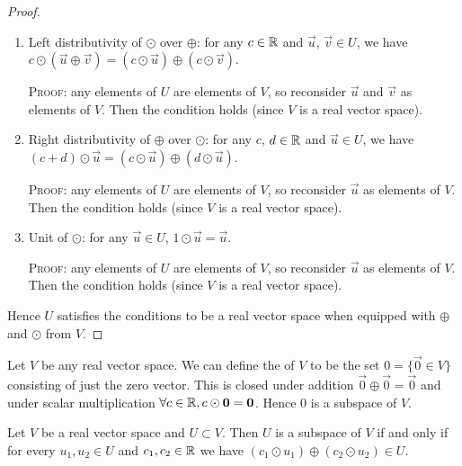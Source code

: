 \begin{proof}
\begin{enumerate}[label=(\arabic*)]
  \textsc{Proof:} This is assumption~\ref{assume:closed-under-scalar-multiplication}.
\item Left distributivity of $\odot$ over $\oplus$:
  for any $c\in\mathbb{R}$ and $\vec{u}$, $\vec{v}\in U$, we have
  $c\odot(\vec{u}\oplus\vec{v}) = (c\odot\vec{u})\oplus(c\odot\vec{v})$.

  \textsc{Proof:} any elements of $U$ are elements of $V$, so reconsider
  $\vec{u}$ and $\vec{v}$ as elements of $V$. Then the condition holds
  (since $V$ is a real vector space).
\item Right distributivity of $\oplus$ over $\odot$:
  for any $c$, $d\in\mathbb{R}$ and $\vec{u}\in U$, we have
  $(c+d)\odot\vec{u} = (c\odot\vec{u})\oplus(d\odot\vec{u})$.

  \textsc{Proof:} any elements of $U$ are elements of $V$, so reconsider
  $\vec{u}$ as elements of $V$. Then the condition holds
  (since $V$ is a real vector space).
\item Unit of $\odot$: for any $\vec{u}\in U$, $1\odot\vec{u}=\vec{u}$.

  \textsc{Proof:} any elements of $U$ are elements of $V$, so reconsider
  $\vec{u}$ as elements of $V$. Then the condition holds
  (since $V$ is a real vector space).
\end{enumerate}
Hence $U$ satisfies the conditions to be a real vector space when
equipped with $\oplus$ and $\odot$ from $V$.
\end{proof}

\begin{example}
Let $V$ be any real vector space. We can define the 
of $V$ to be the set $0=\{\vec{0}\in V\}$ consisting of just the zero
vector. This is closed under addition $\vec{0}\oplus\vec{0}=\vec{0}$ and
under scalar multiplication $\forall c\in\mathbb{R},c\odot\boldsymbol{0}=\boldsymbol{0}$.
Hence $0$ is a subspace of $V$.
\end{example}

\begin{corollary}\label{cor:subspaces:subspace-iff-closed-under-linear-combos}
Let $V$ be a real vector space and $U\subset V$.
Then $U$ is a subspace of $V$ if and only if for every $u_{1},u_{2}\in U$
and $c_{1},c_{2}\in\mathbb{R}$ we have $(c_{1}\odot u_{1})\oplus(c_{2}\odot u_{2})\in U$.
\end{corollary}

